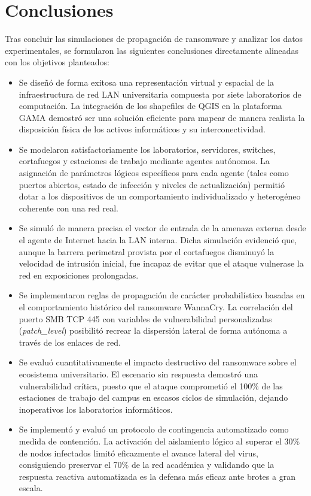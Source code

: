 \section{Conclusiones}

Tras concluir las simulaciones de propagación de ransomware y analizar los datos experimentales, se formularon las siguientes conclusiones directamente alineadas con los objetivos planteados:

\begin{itemize}
    \item Se diseñó de forma exitosa una representación virtual y espacial de la infraestructura de red LAN universitaria compuesta por siete laboratorios de computación. La integración de los shapefiles de QGIS en la plataforma GAMA demostró ser una solución eficiente para mapear de manera realista la disposición física de los activos informáticos y su interconectividad.
    
    \item Se modelaron satisfactoriamente los laboratorios, servidores, switches, cortafuegos y estaciones de trabajo mediante agentes autónomos. La asignación de parámetros lógicos específicos para cada agente (tales como puertos abiertos, estado de infección y niveles de actualización) permitió dotar a los dispositivos de un comportamiento individualizado y heterogéneo coherente con una red real.
    
    \item Se simuló de manera precisa el vector de entrada de la amenaza externa desde el agente de Internet hacia la LAN interna. Dicha simulación evidenció que, aunque la barrera perimetral provista por el cortafuegos disminuyó la velocidad de intrusión inicial, fue incapaz de evitar que el ataque vulnerase la red en exposiciones prolongadas.
    
    \item Se implementaron reglas de propagación de carácter probabilístico basadas en el comportamiento histórico del ransomware WannaCry. La correlación del puerto SMB TCP 445 con variables de vulnerabilidad personalizadas (\textit{patch\_level}) posibilitó recrear la dispersión lateral de forma autónoma a través de los enlaces de red.
    
    \item Se evaluó cuantitativamente el impacto destructivo del ransomware sobre el ecosistema universitario. El escenario sin respuesta demostró una vulnerabilidad crítica, puesto que el ataque comprometió el 100\% de las estaciones de trabajo del campus en escasos ciclos de simulación, dejando inoperativos los laboratorios informáticos.
    
    \item Se implementó y evaluó un protocolo de contingencia automatizado como medida de contención. La activación del aislamiento lógico al superar el 30\% de nodos infectados limitó eficazmente el avance lateral del virus, consiguiendo preservar el 70\% de la red académica y validando que la respuesta reactiva automatizada es la defensa más eficaz ante brotes a gran escala.
\end{itemize}